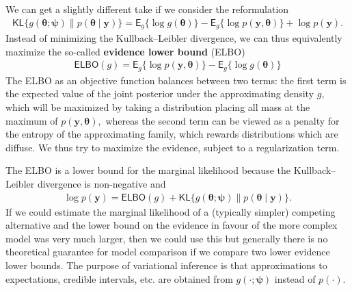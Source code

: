 \documentclass[
  11pt,
  letterpaper,
]{scrbook}
\theoremstyle{plain}
\theoremstyle{plain}
\theoremstyle{plain}
\theoremstyle{definition}
\theoremstyle{definition}
\theoremstyle{definition}
\theoremstyle{remark}
\begin{document}
We can get a slightly different take if we consider the reformulation
\begin{align*}
\mathsf{KL}\{g(\boldsymbol{\theta};\boldsymbol{\psi}) \parallel p(\boldsymbol{\theta} \mid \boldsymbol{y})\} = \mathsf{E}_{g}\{\log g(\boldsymbol{\theta})\} - \mathsf{E}_g\{\log p(\boldsymbol{y}, \boldsymbol{\theta})\} + \log p(\boldsymbol{y}).
\end{align*} Instead of minimizing the Kullback--Leibler divergence, we
can thus equivalently maximize the so-called \textbf{evidence lower
bound} (ELBO) \begin{align*}
\mathsf{ELBO}(g) = \mathsf{E}_g\{\log p(\boldsymbol{y}, \boldsymbol{\theta})\} - \mathsf{E}_{g}\{\log g(\boldsymbol{\theta})\}
\end{align*} The ELBO as an objective function balances between two
terms: the first term is the expected value of the joint posterior under
the approximating density \(g,\) which will be maximized by taking a
distribution placing all mass at the maximum of
\(p(\boldsymbol{y}, \boldsymbol{\theta}),\) whereas the second term can
be viewed as a penalty for the entropy of the approximating family,
which rewards distributions which are diffuse. We thus try to maximize
the evidence, subject to a regularization term.

The ELBO is a lower bound for the marginal likelihood because the
Kullback--Leibler divergence is non-negative and \begin{align*}
\log p(\boldsymbol{y}) = \mathsf{ELBO}(g) +  \mathsf{KL}\{g(\boldsymbol{\theta};\boldsymbol{\psi}) \parallel p(\boldsymbol{\theta} \mid \boldsymbol{y})\}.
\end{align*} If we could estimate the marginal likelihood of a
(typically simpler) competing alternative and the lower bound on the
evidence in favour of the more complex model was very much larger, then
we could use this but generally there is no theoretical guarantee for
model comparison if we compare two lower evidence lower bounds. The
purpose of variational inference is that approximations to expectations,
credible intervals, etc. are obtained from
\(g(\cdot; \boldsymbol{\psi})\) instead of \(p(\cdot).\)
\end{document}
